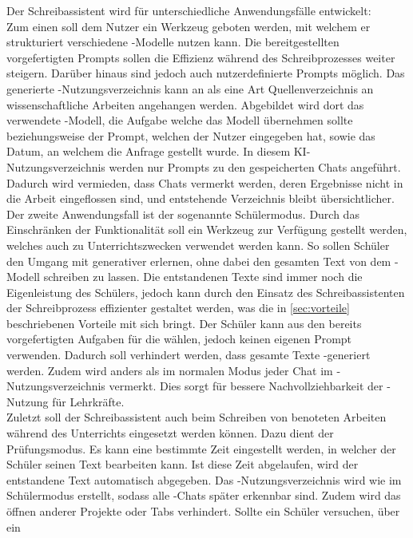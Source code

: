 \documentclass[../main.tex]{subfiles}
\begin{document}
Der Schreibassistent wird für unterschiedliche Anwendungsfälle entwickelt: \\
Zum einen soll dem Nutzer ein Werkzeug geboten werden, mit welchem er strukturiert verschiedene -Modelle nutzen kann. Die bereitgestellten vorgefertigten Prompts sollen die 
Effizienz während des Schreibprozesses weiter steigern. Darüber hinaus sind jedoch auch nutzerdefinierte Prompts möglich. Das generierte -Nutzungsverzeichnis kann an als eine Art 
Quellenverzeichnis an wissenschaftliche Arbeiten angehangen werden. Abgebildet wird dort das verwendete -Modell, die Aufgabe welche das Modell 
übernehmen sollte beziehungsweise der Prompt, welchen der Nutzer eingegeben hat, sowie das Datum, an welchem die Anfrage gestellt wurde. In diesem KI-Nutzungsverzeichnis werden nur 
Prompts zu den gespeicherten Chats angeführt. Dadurch wird vermieden, dass Chats vermerkt werden, deren Ergebnisse nicht in die Arbeit eingeflossen sind, und entstehende Verzeichnis 
bleibt übersichtlicher.\\ 
Der zweite Anwendungsfall ist der sogenannte Schülermodus. Durch das Einschränken der Funktionalität soll ein Werkzeug zur Verfügung gestellt werden, welches auch zu 
Unterrichtszwecken verwendet werden kann. So sollen Schüler den Umgang mit generativer  erlernen, ohne dabei den gesamten Text von dem -Modell schreiben zu lassen. Die 
entstandenen Texte sind immer noch die Eigenleistung des Schülers, jedoch kann durch den Einsatz des Schreibassistenten der Schreibprozess effizienter gestaltet werden, was die in 
\autoref{sec:vorteile} beschriebenen Vorteile mit sich bringt. Der Schüler kann aus den bereits vorgefertigten Aufgaben für die  wählen, jedoch keinen eigenen Prompt verwenden. Dadurch soll 
verhindert werden, dass gesamte Texte -generiert werden. Zudem wird anders als im normalen Modus jeder Chat im -Nutzungsverzeichnis vermerkt. Dies sorgt für bessere 
Nachvollziehbarkeit der -Nutzung für Lehrkräfte.\\ 
Zuletzt soll der Schreibassistent auch beim Schreiben von benoteten Arbeiten während des Unterrichts eingesetzt werden können. Dazu dient der Prüfungsmodus. Es kann eine bestimmte 
Zeit eingestellt werden, in welcher der Schüler seinen Text bearbeiten kann. Ist diese Zeit abgelaufen, wird der entstandene Text automatisch abgegeben. Das -Nutzungsverzeichnis 
wird wie im Schülermodus erstellt, sodass alle -Chats später erkennbar sind. Zudem wird das öffnen anderer Projekte oder Tabs verhindert. Sollte ein Schüler versuchen, über ein 
\end{document}
